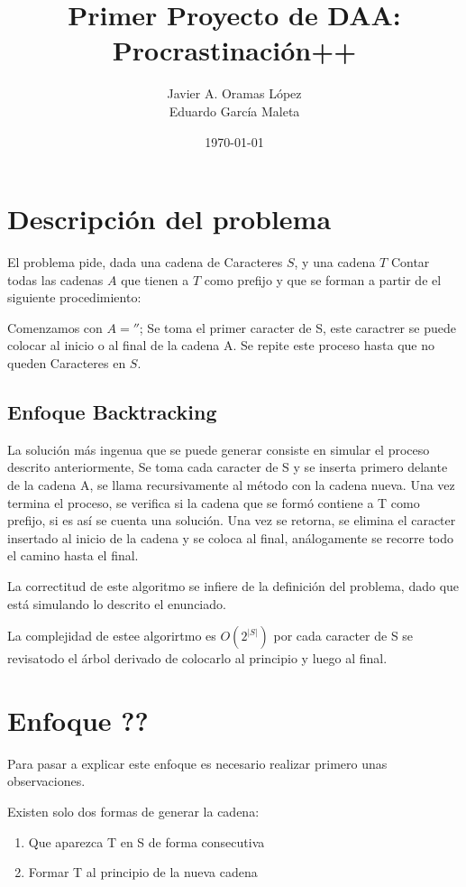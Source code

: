 \documentclass{article}
\title{Primer Proyecto de DAA: Procrastinación++}
\author{
    Javier A. Oramas López \\
    Eduardo García Maleta
}
\date{\today}
\begin{document}
\maketitle

\section{Descripción del problema}

El problema pide, dada una cadena de Caracteres $S$, y una cadena $T$
Contar todas las cadenas $A$ que tienen a $T$ como prefijo y que se forman a partir de el siguiente procedimiento:

Comenzamos con $A = ''$; 
Se toma el primer caracter de S, este caractrer se puede colocar al inicio o al final de la cadena A.
Se repite este proceso hasta que no queden Caracteres en $S$.

\subsection{Enfoque Backtracking}
La solución más ingenua que se puede generar consiste en simular el proceso descrito anteriormente,
Se toma cada caracter de S y se inserta primero delante de la cadena A, se llama recursivamente al método con la cadena nueva.
Una vez termina el proceso, se verifica si la cadena que se formó contiene a T como prefijo, si es así se cuenta una solución.
Una vez se retorna, se elimina el caracter insertado al inicio de la cadena y se coloca al final, análogamente se recorre todo el camino hasta el final.

La correctitud de este algoritmo se infiere de la definición del problema, dado que está simulando lo descrito el enunciado.

La complejidad de estee algorirtmo es $O(2^|S|)$ por cada caracter de S se revisatodo el árbol derivado de colocarlo al principio y luego al final.

\section{Enfoque ??}
Para pasar a explicar este enfoque es necesario realizar primero unas observaciones.

Existen solo dos formas de generar la cadena:
\begin{enumerate}
    \item Que aparezca T en S de forma consecutiva
    \item Formar T al principio de la nueva cadena
\end{enumerate}
\end{document}
